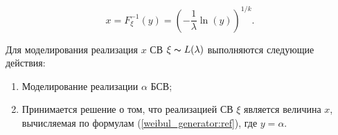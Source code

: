 \begin{equation}
		x = F_{\xi}^{-1}(y) = \left(-\frac{1}{\lambda}\ln(y)\right)^{1/k}.
		\label{weibul_generator:ref}
\end{equation}

Для моделирования реализация $x$ СВ $\xi \thicksim L(\lambda)$ выполняются следующие действия:
\begin{enumerate}
	\item Моделирование реализации $\alpha$ БСВ;
	\item Принимается решение о том, что реализацией СВ $\xi$ является величина $x$, вычисляемая по формулам (\ref{weibul_generator:ref}), где $y=\alpha$.
\end{enumerate}
